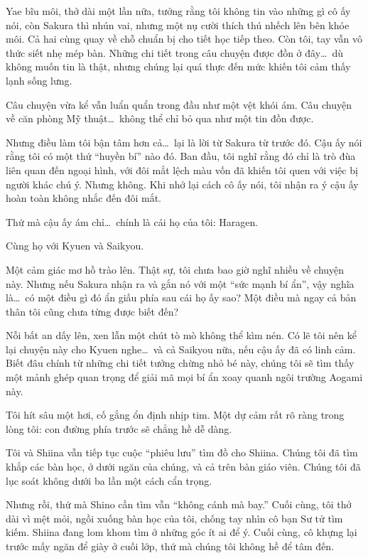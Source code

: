 \documentclass[../main.tex]{subfiles}
\begin{document}
Yae bĩu môi, thở dài một lần nữa, tưởng rằng tôi không tin vào những gì cô ấy nói, còn Sakura thì nhún vai, nhưng một nụ cười thích thú nhếch lên bên khóe môi. Cả hai cùng quay về chỗ chuẩn bị cho tiết học tiếp theo. Còn tôi, tay vẫn vô thức siết nhẹ mép bàn. Những chi tiết trong câu chuyện được đồn ở đây\dots\ dù không muốn tin là thật, nhưng chúng lại quá thực đến mức khiến tôi cảm thấy lạnh sống lưng.

Câu chuyện vừa kể vẫn luẩn quẩn trong đầu như một vệt khói ám. Câu chuyện về căn phòng Mỹ thuật\dots\ không thể chỉ bỏ qua như một tin đồn được.

Nhưng điều làm tôi bận tâm hơn cả\dots\ lại là lời từ Sakura từ trước đó. Cậu ấy nói rằng tôi có một thứ ``huyền bí'' nào đó. Ban đầu, tôi nghĩ rằng đó chỉ là trò đùa liên quan đến ngoại hình, với đôi mắt lệch màu vốn đã khiến tôi quen với việc bị người khác chú ý. Nhưng không. Khi nhớ lại cách cô ấy nói, tôi nhận ra ý cậu ấy hoàn toàn không nhắc đến đôi mắt.

Thứ mà cậu ấy ám chỉ\dots\ chính là cái họ của tôi: Haragen.

Cùng họ với Kyuen và Saikyou.

Một cảm giác mơ hồ trào lên. Thật sự, tôi chưa bao giờ nghĩ nhiều về chuyện này. Nhưng nếu Sakura nhận ra và gắn nó với một ``sức mạnh bí ẩn'', vậy nghĩa là\dots\ có một điều gì đó ẩn giấu phía sau cái họ ấy sao? Một điều mà ngay cả bản thân tôi cũng chưa từng được biết đến?

Nỗi bất an dấy lên, xen lẫn một chút tò mò không thể kìm nén. Có lẽ tôi nên kể lại chuyện này cho Kyuen nghe\dots\ và cả Saikyou nữa, nếu cậu ấy đã có linh cảm. Biết đâu chính từ những chi tiết tưởng chừng nhỏ bé này, chúng tôi sẽ tìm thấy một mảnh ghép quan trọng để giải mã mọi bí ẩn xoay quanh ngôi trường Aogami này.

Tôi hít sâu một hơi, cố gắng ổn định nhịp tim. Một dự cảm rất rõ ràng trong lòng tôi: con đường phía trước sẽ chẳng hề dễ dàng.


Tôi và Shiina vẫn tiếp tục cuộc ``phiêu lưu'' tìm đồ cho Shiina. Chúng tôi đã tìm khắp các bàn học, ở dưới ngăn của chúng, và cả trên bàn giáo viên. Chúng tôi đã lục soát không dưới ba lần một cách cẩn trọng.

Nhưng rồi, thứ mà Shino cần tìm vẫn ``không cánh mà bay.'' Cuối cùng, tôi thở dài vì mệt mỏi, ngồi xuống bàn học của tôi, chống tay nhìn cô bạn Sư tử tìm kiếm. Shiina đang lom khom tìm ở những góc ít ai để ý. Cuối cùng, cô khựng lại trước mấy ngăn để giày ở cuối lớp, thứ mà chúng tôi không hề để tâm đến.
\end{document}
